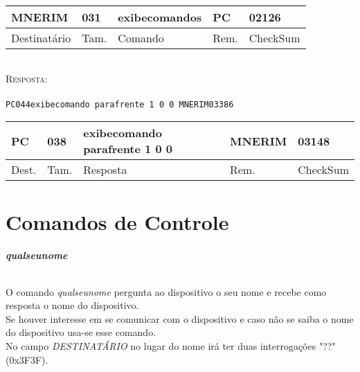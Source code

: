 \documentclass[11pt,	 papera4]{article}
\begin{document}
\begin{table}[h]
	\centering
	\begin{tabular}{p{2cm}p{1cm}p{3cm}p{1cm}p{2cm}}
		\toprule
		MNERIM & 031 & exibecomandos & PC & 02126 \\
		\midrule	
		Destinatário & Tam. & Comando & Rem. &CheckSum \\
		\bottomrule
	\end{tabular}
	\label{tab:formatoslatex} %
\end{table}
\paragraph*{\newline\newline}
\hspace*{0.8cm}\textsc{Resposta:} \\\\ \hspace*{2cm}\texttt{PC044exibecomando parafrente 1 0 0 MNERIM03386} 

\begin{table}[h]
	\centering
	\begin{tabular}{p{1cm}p{1cm}p{3cm}p{2cm}p{2cm}}
		\toprule
		PC & 038 & exibecomando parafrente 1 0 0  & MNERIM & 03148 \\
		\midrule	
		Dest. & Tam. & Resposta  & Rem. & CheckSum \\
		\bottomrule
	\end{tabular}
	\label{tab:formatoslatex} %
\end{table}

\newpage

\part*{Comandos de Controle \newline}
	

\paragraph{\textbf{qualseunome} \newline \newline}
O comando \textit{qualseunome} pergunta ao dispositivo o seu nome e recebe como resposta o nome do dispositivo. \\
Se houver interesse em se comunicar com o dispositivo e
caso não se saiba o nome do dispositivo usa-se esse comando. \\
No campo \textit{DESTINATÁRIO} no lugar do nome irá ter duas interrogações "??" (0x3F3F).
\\
\end{document}
